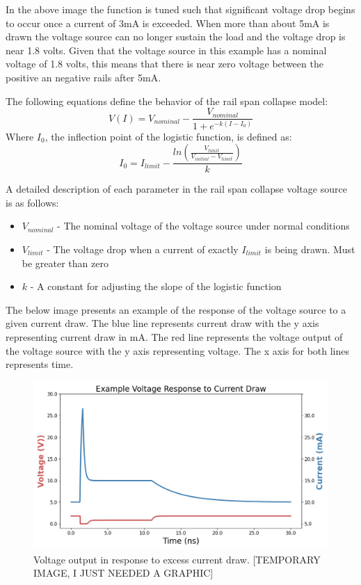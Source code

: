 \documentclass[conference]{IEEEtran}
\begin{document}
In the above image the function is tuned such that significant voltage drop begins to occur once a current of 3mA is exceeded. When more than about 5mA is drawn the voltage source can no longer sustain the load and the voltage drop is near 1.8 volts. Given that the voltage source in this example has a nominal voltage of 1.8 volts, this means that there is near zero voltage between the positive an negative rails after 5mA.

The following equations define the behavior of the rail span collapse model:
{\Large
\[V(I)=V_{nominal}-\frac{V_{nominal}}{1+e^{-k(I-I_0)}}\]
}
Where \(I_0\), the inflection point of the logistic function, is defined as:
{\Large
\[I_0=I_{limit}-\frac{ln(\frac{V_{limit}}{V_{initial}-V_{limit}})}{k}\]
}

A detailed description of each parameter in the rail span collapse voltage source is as follows:

\begin{itemize}

\item[] \(V_{nominal}\) - The nominal voltage of the voltage source under normal conditions

\item[] \(V_{limit}\) - The voltage drop when a current of exactly \(I_{limit}\) is being drawn. Must be greater than zero

\item[] \(k\) - A constant for adjusting the slope of the logistic function

\end{itemize}
\vspace{1em}

The below image presents an example of the response of the voltage source to a given current draw. The blue line represents current draw with the y axis representing current draw in mA. The red line represents the voltage output of the voltage source with the y axis representing voltage. The x axis for both lines represents time.

\begin{figure}[htbp]
\centering
\includegraphics[width=0.95\linewidth]{Rail_Collapse_Response.png}
\caption{Voltage output in response to excess current draw. [TEMPORARY IMAGE, I JUST NEEDED A GRAPHIC]}
\label{fig:rail_collapse_response}
\end{figure}
\end{document}
